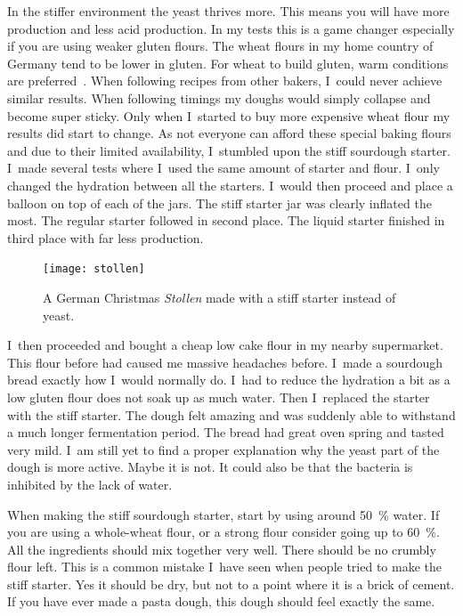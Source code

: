 In the stiffer environment the yeast thrives more. This means you will have
more  production and less acid production. In my tests this is a game
changer especially if you are using weaker gluten flours. The wheat flours in
my home country of Germany tend to be lower in gluten. For wheat to build gluten, warm conditions
are preferred~\cite{gluten+development+temperatures}. When following recipes
from other bakers, I~could never achieve similar results. When following
timings my doughs would
simply collapse and become super sticky. Only when I~started to buy more
expensive wheat flour my results did start to change. As not everyone can afford
these special baking flours and due to their limited availability, I~stumbled upon the
stiff sourdough starter. I~made several tests where I~used the same amount of
starter and flour. I~only changed the hydration between all the starters.
I~would then proceed and place a balloon on top of each of the jars. The stiff
starter jar was clearly inflated the most. The regular starter
followed in second place. The liquid starter finished in third place with far less 
production.

\begin{figure}[!htb]
  \texttt{[image: stollen]}
  \caption[Christmas \emph{Stollen}]{A German Christmas \emph{Stollen} made
      with a stiff starter instead of yeast.}%
  \label{fig:stollen}
\end{figure}

I~then proceeded and bought a cheap low cake flour in my nearby supermarket.
This flour before had caused me massive headaches before. I~made a sourdough bread
exactly how I~would normally do. I~had to reduce the hydration a bit as a low
gluten flour does not soak up as much water. Then I~replaced the starter with
the stiff starter. The dough felt amazing and was suddenly able to withstand a
much longer fermentation period. The bread had great oven spring and tasted
very mild. I~am still yet to find a proper explanation why the yeast part of
the dough is more active. Maybe it is not. It could also be that the bacteria
is inhibited by the lack of water.

When making the stiff sourdough starter, start by using around \qty{50}{\percent}
water. If you are using a whole-wheat flour, or a strong flour consider going
up to \qty{60}{\percent}. All the ingredients should mix together very well. There
should be no crumbly flour left. This is a common mistake I~have seen when
people tried to make the stiff starter. Yes it should be dry, but not to a
point where it is a brick of cement. If you have ever made a pasta dough, this
dough should feel exactly the same.

